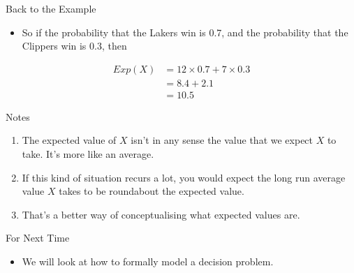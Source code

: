 \documentclass[
  ignorenonframetext,
]{beamer}
\providecommand{\tightlist}{%
  \setlength{\itemsep}{0pt}\setlength{\parskip}{0pt}}
\renewcommand{\,}{\text{, }}
\begin{document}
\begin{frame}{Back to the Example}
\protect\hypertarget{back-to-the-example}{}

\begin{itemize}
\tightlist
\item
  So if the probability that the Lakers win is 0.7, and the probability
  that the Clippers win is 0.3, then
\end{itemize}

\begin{align*}
Exp(X) &= 12 \times 0.7 + 7 \times 0.3 \\
 &= 8.4 + 2.1 \\
 &= 10.5
\end{align*}

\end{frame}

\begin{frame}{Notes}
\protect\hypertarget{notes}{}

\begin{enumerate}
\tightlist
\item
  The expected value of \(X\) isn't in any sense the value that we
  expect \(X\) to take. It's more like an average.
\item
  If this kind of situation recurs a lot, you would expect the long run
  average value \(X\) takes to be roundabout the expected value.
\item
  That's a better way of conceptualising what expected values are.
\end{enumerate}

\end{frame}

\begin{frame}{For Next Time}
\protect\hypertarget{for-next-time}{}

\begin{itemize}
\tightlist
\item
  We will look at how to formally model a decision problem.
\end{itemize}

\end{frame}
\end{document}
